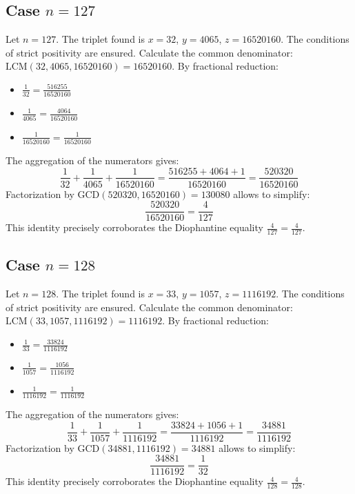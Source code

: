 \documentclass[11pt,a4paper]{article}
\begin{document}
\subsection{Case $n = 127$}
Let $n = 127$. The triplet found is $x = 32$, $y = 4065$, $z = 16520160$.
The conditions of strict positivity are ensured.
Calculate the common denominator: $\text{LCM}(32, 4065, 16520160) = 16520160$.
By fractional reduction:
\begin{itemize}
    \item $\frac{1}{32} = \frac{516255}{16520160}$
    \item $\frac{1}{4065} = \frac{4064}{16520160}$
    \item $\frac{1}{16520160} = \frac{1}{16520160}$
\end{itemize}
The aggregation of the numerators gives:
$$ \frac{1}{32} + \frac{1}{4065} + \frac{1}{16520160} = \frac{516255 + 4064 + 1}{16520160} = \frac{520320}{16520160} $$
Factorization by $\text{GCD}(520320, 16520160) = 130080$ allows to simplify:
$$ \frac{520320}{16520160} = \frac{4}{127} $$
This identity precisely corroborates the Diophantine equality $\frac{4}{127} = \frac{4}{127}$.

\subsection{Case $n = 128$}
Let $n = 128$. The triplet found is $x = 33$, $y = 1057$, $z = 1116192$.
The conditions of strict positivity are ensured.
Calculate the common denominator: $\text{LCM}(33, 1057, 1116192) = 1116192$.
By fractional reduction:
\begin{itemize}
    \item $\frac{1}{33} = \frac{33824}{1116192}$
    \item $\frac{1}{1057} = \frac{1056}{1116192}$
    \item $\frac{1}{1116192} = \frac{1}{1116192}$
\end{itemize}
The aggregation of the numerators gives:
$$ \frac{1}{33} + \frac{1}{1057} + \frac{1}{1116192} = \frac{33824 + 1056 + 1}{1116192} = \frac{34881}{1116192} $$
Factorization by $\text{GCD}(34881, 1116192) = 34881$ allows to simplify:
$$ \frac{34881}{1116192} = \frac{1}{32} $$
This identity precisely corroborates the Diophantine equality $\frac{4}{128} = \frac{4}{128}$.
\end{document}
